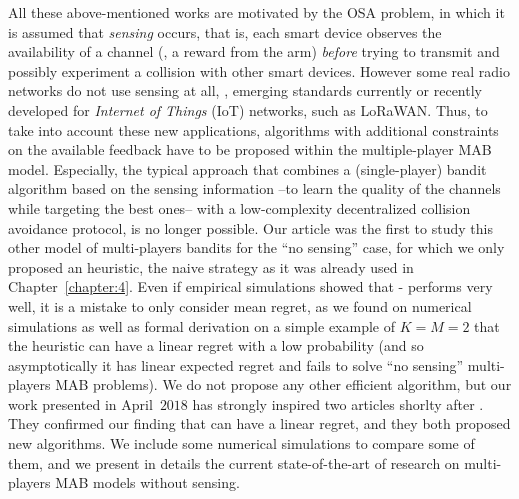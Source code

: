 All these above-mentioned works are motivated by the OSA problem, in which it is assumed that \emph{sensing} occurs, that is, each smart device observes the availability of a channel (\ie, a reward from the arm) \emph{before} trying to transmit and possibly experiment a collision with other smart devices.
However some real radio networks do not use sensing at all, \eg, emerging standards currently or recently developed for \emph{Internet of Things} (IoT) networks, such as LoRaWAN.
Thus, to take into account these new applications, algorithms with additional constraints on the available feedback have to be proposed within the multiple-player MAB model.
Especially, the typical approach that combines a (single-player) bandit algorithm based on the sensing information --to learn the quality of the channels while targeting the best ones-- with a low-complexity decentralized collision avoidance protocol, is no longer possible.
%
Our article \cite{Besson2018ALT} was the first to study this other model of multi-players bandits for the ``no sensing'' case,
for which we only proposed an heuristic, the naive \Selfish{} strategy as it was already used in Chapter~\ref{chapter:4}.
Even if empirical simulations showed that \Selfish-\klUCB{} performs very well, it is a mistake to only consider mean regret, as we found on numerical simulations as well as formal derivation on a simple example of $K=M=2$ that the \Selfish{} heuristic can have a linear regret with a low probability (and so asymptotically it has linear expected regret and fails to solve ``no sensing'' multi-players MAB problems).
We do not propose any other efficient algorithm, but our work presented in April~$2018$ has strongly inspired two articles shorlty after \cite{LugosiMehrabian18,BoursierPerchet18}.
They confirmed our finding that \Selfish{} can have a linear regret, and they both proposed new algorithms.
We include some numerical simulations to compare some of them, and we present in details the current state-of-the-art of research on multi-players MAB models without sensing.


